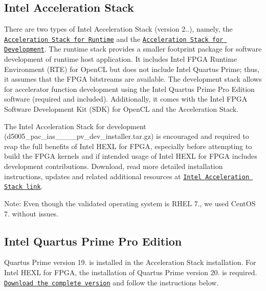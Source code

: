 \subsection*{Intel Acceleration Stack}

There are two types of Intel Acceleration Stack (version 2..), namely, the \href{https://www.intel.com/content/www/us/en/programmable/f/download/accelerator/license-agreement-pac-d5005.html?swcode=WWW-SWD-IAS-RTE-201}{\tt Acceleration Stack for Runtime} and the \href{https://www.intel.com/content/altera-www/global/en_us/index/f/download/accelerator/pac-d5005-thank-you.html?swcode=WWW-SWD-IAS-DEV-201}{\tt Acceleration Stack for Development}. The runtime stack provides a smaller footprint package for software development of runtime host application. It includes Intel F\-P\-G\-A Runtime Environment (R\-T\-E) for Open\-C\-L but does not include Intel Quartus Prime; thus, it assumes that the F\-P\-G\-A bitstreams are available. The development stack allows for accelerator function development using the Intel Quartus Prime Pro Edition software (required and included). Additionally, it comes with the Intel F\-P\-G\-A Software Development Kit (S\-D\-K) for Open\-C\-L and the Acceleration Stack. \par


The Intel Acceleration Stack for development ({\ttfamily d5005\-\_\-pac\-\_\-ias\-\_\-\_\-\_\-\_\-pv\-\_\-dev\-\_\-installer.\-tar.\-gz}) is encouraged and required to reap the full benefits of Intel H\-E\-X\-L for F\-P\-G\-A, especially before attempting to build the F\-P\-G\-A kernels and if intended usage of Intel H\-E\-X\-L for F\-P\-G\-A includes development contributions. Download, read more detailed installation instructions, updates and related additional resources at \href{https://www.intel.com/content/www/us/en/programmable/products/boards_and_kits/dev-kits/altera/intel-fpga-pac-d5005/getting-started.html}{\tt Intel Acceleration Stack link}. \par


Note\-: Even though the validated operating system is R\-H\-E\-L 7., we used Cent\-O\-S 7. without issues.\par


\subsection*{Intel Quartus Prime Pro Edition}

Quartus Prime version 19. is installed in the Acceleration Stack installation. For Intel H\-E\-X\-L for F\-P\-G\-A, the installation of Quartus Prime version 20. is required. \href{https://fpgasoftware.intel.com/20.3/?edition=pro}{\tt Download the complete version} and follow the instructions below. \par


